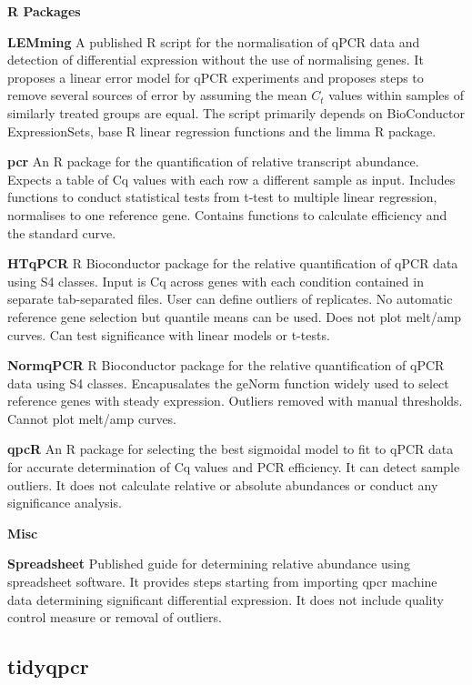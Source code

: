 \documentclass{SBCbookchapter}
\begin{document}
\textbf{R Packages}

\textbf{LEMming} A published R script for the normalisation of qPCR data and detection of differential expression without the use of normalising genes. It proposes a linear error model for qPCR experiments and proposes steps to remove several sources of error by assuming the mean $C_t$ values within samples of similarly treated groups are equal. The script primarily depends on BioConductor ExpressionSets, base R linear regression functions and the limma R package. \cite{Feuer2015}

\textbf{pcr} An R package for the quantification of relative transcript abundance. Expects a table of Cq values with each row a different sample as input. Includes functions to conduct statistical tests from t-test to multiple linear regression, normalises to one reference gene. Contains functions to calculate efficiency and the standard curve. \cite{Ahmed2018}

\textbf{HTqPCR} R Bioconductor package for the relative quantification of qPCR data using S4 classes. Input is Cq across genes with each condition contained in separate tab-separated files. User can define outliers of replicates. No automatic reference gene selection but quantile means can be used. Does not plot melt/amp curves. Can test significance with linear models or t-tests. \cite{Dvinge2009}

\textbf{NormqPCR}  R Bioconductor package for the relative quantification of qPCR data using S4 classes. Encapusalates the geNorm function widely used to select reference genes with steady expression. Outliers removed with manual thresholds. Cannot plot melt/amp curves. \cite{Perkins2012}

\textbf{qpcR} An R package for selecting the best sigmoidal model to fit to qPCR data for accurate determination of Cq values and PCR efficiency. It can detect sample outliers. It does not calculate relative or absolute abundances or conduct any significance analysis. \cite{Ritz2008}

\textbf{Misc}

\textbf{Spreadsheet} Published guide for determining relative abundance using spreadsheet software. It provides steps starting from importing qpcr machine data determining significant differential expression. It does not include quality control measure or removal of outliers. \cite{Ng2021}

\subsection{tidyqpcr}
\end{document}
